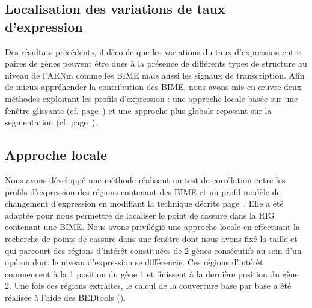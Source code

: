 \documentclass[12pt,a4paper]{report}
\begin{document}
\begin{onehalfspace}
\section*{Localisation des variations de taux d'expression}

Des résultats précédents, il découle que les variations du taux d’expression entre paires de gènes peuvent être dues à la présence de différents types de structure au niveau de l’ARNm comme les BIME mais aussi les signaux de transcription. Afin de mieux appréhender la contribution des BIME, nous avons mis en œuvre deux méthodes exploitant les profils d’expression : une approche locale basée sur une fenêtre glissante (cf. page~\pageref{methode_correlation}) et une approche plus globale reposant sur la segmentation (cf. page~\pageref{methode_segmentation}). 

\subsection*{Approche locale}
\label{approche_locale}

Nous avons développé une méthode réalisant un test de corrélation entre les profils d'expression des régions contenant des BIME et un profil modèle de changement d'expression en modifiant la technique décrite page~\pageref{methode_correlation}. Elle a été adaptée pour nous permettre de localiser le point de cassure dans la RIG contenant une BIME. Nous avons privilégié une approche locale en effectuant la recherche de points de cassure dans une fenêtre dont nous avons fixé la taille et qui parcourt des régions d'intérêt constituées de 2 gènes consécutifs au sein d'un opéron dont le niveau d'expression se différencie. Ces régions d'intérêt commencent à la 1 position du gène 1 et finissent à la dernière position du gène 2. Une fois ces régions extraites, le calcul de la couverture base par base a été réalisée à l'aide des BEDtools ().


\end{onehalfspace}
\end{document}
